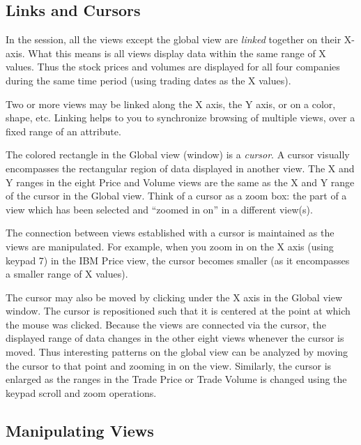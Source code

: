 
\subsection{Links and Cursors}

In the  session, all the views except the global view are {\em
linked} together on their X-axis. What this means is all views display data
within the same range of X values. Thus the stock prices and volumes are
displayed for all four companies during the same time period (using trading
dates as the X values).

Two or more views may be linked along the X axis, the Y axis, or on a color,
shape, etc. Linking helps to you to synchronize browsing of multiple views, over
a fixed range of an attribute.

The colored rectangle in the Global view (window) is a {\em cursor}. A cursor
visually encompasses the rectangular region of data displayed in another
view. The X and Y ranges in the eight Price and Volume views are the same as the
X and Y range of the cursor in the Global view. Think of a cursor as a zoom box:
the part of a view which has been selected and ``zoomed in on'' in a different
view(s).

The connection between views established with a cursor is maintained as the
views are manipulated. For example, when you zoom in on the X axis (using keypad
7) in the IBM Price view, the cursor becomes smaller (as it encompasses a
smaller range of X values).

The cursor may also be moved by clicking under the X axis in the Global view
window. The cursor is repositioned such that it is centered at the point at
which the mouse was clicked. Because the views are connected via the cursor, the
displayed range of data changes in the other eight views whenever the cursor is
moved. Thus interesting patterns on the global view can be analyzed by moving
the cursor to that point and zooming in on the view. Similarly, the cursor is
enlarged as the ranges in the Trade Price or Trade Volume is changed using the
keypad scroll and zoom operations.


\subsection{Manipulating Views}

